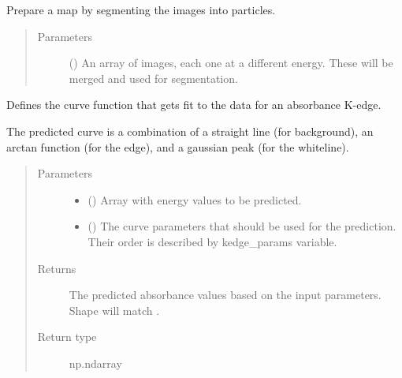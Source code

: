 \documentclass[letterpaper,10pt,english]{sphinxmanual}
\begin{document}

\begin{fulllineitems}
\label{\detokenize{xanespy:xanespy.xanes_math.particle_labels}}
Prepare a map by segmenting the images into particles.
\begin{quote}\begin{description}
\item[{Parameters}] \leavevmode
{} () \textendash{} An array of images, each one at a different energy. These will
be merged and used for segmentation.

\end{description}\end{quote}

\end{fulllineitems}


\begin{fulllineitems}
\label{\detokenize{xanespy:xanespy.xanes_math.predict_edge}}
Defines the curve function that gets fit to the data for an
absorbance K-edge.

The predicted curve is a combination of a straight line (for
background), an arctan function (for the edge), and a gaussian
peak (for the whiteline).
\begin{quote}\begin{description}
\item[{Parameters}] \leavevmode\begin{itemize}
\item {} 
 () \textendash{} Array with energy values to be predicted.

\item {} 
 (\sphinxstyleliteralemphasis{(}\sphinxstyleliteralemphasis{)}) \textendash{} The curve parameters that should be used for the
prediction. Their order is described by kedge\_params variable.

\end{itemize}

\item[{Returns}] \leavevmode
{} \textendash{} The predicted absorbance values based on the input
parameters. Shape will match .

\item[{Return type}] \leavevmode
np.ndarray

\end{description}\end{quote}

\end{fulllineitems}
\end{document}
